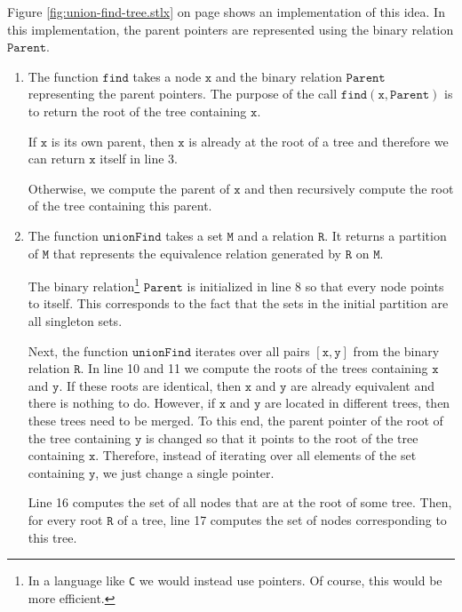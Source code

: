 Figure \ref{fig:union-find-tree.stlx} on page \pageref{fig:union-find-tree.stlx} shows an
implementation of this idea.  In this implementation, the parent pointers are represented using the
binary relation $\texttt{Parent}$.  
\begin{enumerate}
\item The function $\texttt{find}$ takes a node $\texttt{x}$ and the binary relation $\texttt{Parent}$ 
      representing the parent pointers.  The purpose of the call $\texttt{find}(\texttt{x}, \texttt{Parent})$ is to
      return the root of the tree containing $\texttt{x}$.

      If $\texttt{x}$ is its own parent, then $\texttt{x}$ is already at the root of a tree and therefore 
      we can return $\texttt{x}$ itself in line 3.

      Otherwise, we compute the parent of $\texttt{x}$ and then recursively compute the root of the tree
      containing this parent.  
\item The function $\texttt{unionFind}$ takes a set $\texttt{M}$ and a relation $\texttt{R}$.  It returns
      a partition of $\texttt{M}$ that represents the equivalence relation generated by $\texttt{R}$ on
      $\texttt{M}$.

      The binary relation\footnote{
        In a language like \texttt{C} we would instead use pointers.  Of course, this would be more efficient.
      } $\texttt{Parent}$ is initialized in line 8 so that every node
      points to itself.   This corresponds to the fact that the sets in the initial partition are all
      singleton sets.  

      Next, the function $\texttt{unionFind}$ iterates over all pairs $[\texttt{x}, \texttt{y}]$ from the binary
      relation $\texttt{R}$.  In line 10 and 11 we compute the roots of the trees containing $\texttt{x}$ and
      $\texttt{y}$.  If these roots are identical, then $\texttt{x}$ and $\texttt{y}$ are already
      equivalent and there is nothing to do.  However, if $\texttt{x}$ and $\texttt{y}$ are located 
      in different trees, then these trees need to be merged.  To this end, the parent pointer of
      the root of the tree containing $\texttt{y}$ is changed so that it 
      points to the root of the tree containing $\texttt{x}$.  Therefore, instead of iterating over all
      elements of the set containing $\texttt{y}$, we just change a single pointer.

      Line 16 computes the set of all nodes that are at the root of some tree.  Then, for every root
      $\texttt{R}$ of a tree, line 17 computes the set of nodes corresponding to this tree.
\end{enumerate}

